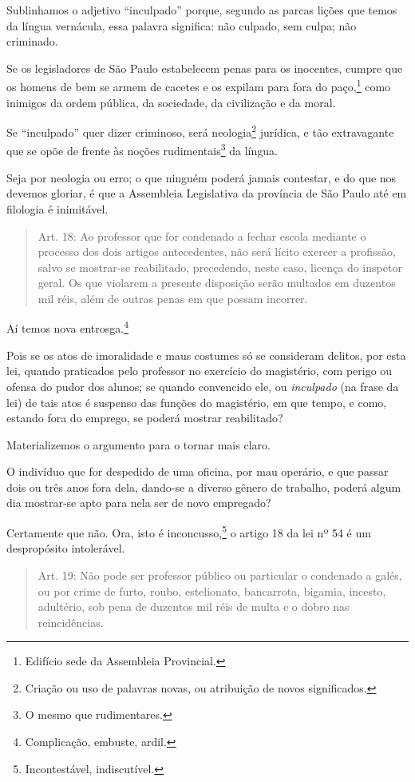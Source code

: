 Sublinhamos o adjetivo ``inculpado'' porque, segundo as parcas lições que
temos da língua vernácula, essa palavra significa: não culpado, sem
culpa; não criminado.

Se os legisladores de São Paulo estabelecem penas para os inocentes,
cumpre que os homens de bem se armem de cacetes e os expilam para fora
do paço,\footnote{Edifício sede da Assembleia Provincial.} como
inimigos da ordem pública, da sociedade, da civilização e da moral.

Se ``inculpado'' quer dizer criminoso, será neologia\footnote{Criação ou
  uso de palavras novas, ou atribuição de novos significados.} jurídica,
e tão extravagante que se opõe de frente às noções
rudimentais\footnote{O mesmo que rudimentares.} da língua.

Seja por neologia ou erro; o que ninguém poderá jamais contestar, e do
que nos devemos gloriar, é que a Assembleia Legislativa da província de
São Paulo até em filologia é inimitável.

\begin{quote}
Art. 18: Ao professor que for condenado a fechar escola mediante o
processo dos dois artigos antecedentes, não será lícito exercer a
profissão, salvo se mostrar-se reabilitado, precedendo, neste caso,
licença do inspetor geral. Os que violarem a presente disposição serão
multados em duzentos mil réis, além de outras penas em que possam
incorrer.
\end{quote}

Aí temos nova entrosga.\footnote{Complicação, embuste, ardil.}

Pois se os atos de imoralidade e maus costumes só se consideram delitos,
por esta lei, quando praticados pelo professor no exercício do
magistério, com perigo ou ofensa do pudor dos alunos; se quando
convencido ele, ou \emph{inculpado} (na frase da lei) de tais atos é
suspenso das funções do magistério, em que tempo, e como, estando fora
do emprego, se poderá mostrar reabilitado?

Materializemos o argumento para o tornar mais claro.

O indivíduo que for despedido de uma oficina, por mau operário, e que
passar dois ou três anos fora dela, dando-se a diverso gênero de
trabalho, poderá algum dia mostrar-se apto para nela ser de novo
empregado?

Certamente que não. Ora, isto é inconcusso,\footnote{Incontestável,
  indiscutível.} o artigo 18 da lei nº 54 é um despropósito
intolerável.

\begin{quote}
Art. 19: Não pode ser professor público ou particular o condenado a
galés, ou por crime de furto, roubo, estelionato, bancarrota, bigamia,
incesto, adultério, sob pena de duzentos mil réis de multa e o dobro nas
reincidências.
\end{quote}

